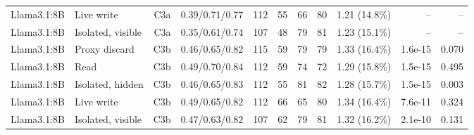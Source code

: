 \begin{table}[t]
\begin{tabularx}{\textwidth}{@{}llrYrrrrrrr@{}}
Llama3.1:8B & Live write & C3a & 0.39/0.71/0.77 & 112 & 55 & 66 & 80 & 1.21 (14.8\%) & -- & -- \\
Llama3.1:8B & Isolated, visible & C3a & 0.35/0.61/0.74 & 107 & 48 & 79 & 81 & 1.23 (15.1\%) & -- & -- \\
Llama3.1:8B & Proxy discard & C3b & 0.46/0.65/0.82 & 115 & 59 & 79 & 79 & 1.33 (16.4\%) & 1.6e-15 & 0.070 \\
Llama3.1:8B & Read & C3b & 0.49/0.70/0.84 & 112 & 59 & 74 & 72 & 1.29 (15.8\%) & 1.5e-15 & 0.495 \\
Llama3.1:8B & Isolated, hidden & C3b & 0.46/0.65/0.83 & 112 & 55 & 81 & 82 & 1.28 (15.7\%) & 1.5e-15 & 0.003 \\
Llama3.1:8B & Live write & C3b & 0.49/0.65/0.82 & 112 & 66 & 65 & 80 & 1.34 (16.4\%) & 7.6e-11 & 0.324 \\
Llama3.1:8B & Isolated, visible & C3b & 0.47/0.63/0.82 & 107 & 62 & 79 & 81 & 1.32 (16.2\%) & 2.1e-10 & 0.131 \\
\bottomrule\end{tabularx}
\end{table}
